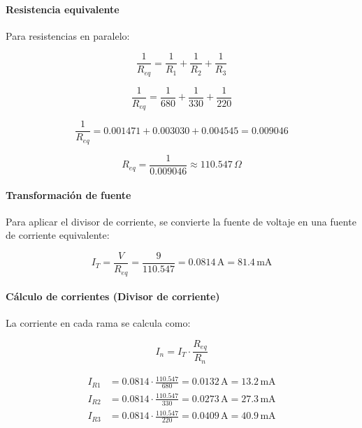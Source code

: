 \documentclass[conference]{IEEEtran}
\begin{document}
\paragraph{Resistencia equivalente}

Para resistencias en paralelo:

\begin{equation*}
  \frac{1}{R_{eq}} = \frac{1}{R_1} + \frac{1}{R_2} + \frac{1}{R_3}
\end{equation*}

\begin{equation*}
  \frac{1}{R_{eq}} = \frac{1}{680} + \frac{1}{330} + \frac{1}{220}
\end{equation*}

\begin{equation*}
  \frac{1}{R_{eq}} = 0.001471 + 0.003030 + 0.004545 = 0.009046
\end{equation*}

\begin{equation*}
  R_{eq} = \frac{1}{0.009046} \approx 110.547\,\Omega
\end{equation*}

\paragraph{Transformación de fuente}

Para aplicar el divisor de corriente, se convierte la fuente de voltaje en una fuente de corriente equivalente:

\begin{equation*}
  I_T = \frac{V}{R_{eq}} = \frac{9}{110.547} = 0.0814\,\text{A} = 81.4\,\text{mA}
\end{equation*}

\paragraph{Cálculo de corrientes (Divisor de corriente)}

La corriente en cada rama se calcula como:

\begin{equation}
  I_n = I_T \cdot \frac{R_{eq}}{R_n}
\end{equation}

\begin{align*}
  I_{R1} &= 0.0814 \cdot \frac{110.547}{680} 
         = 0.0132\,\text{A} = 13.2\,\text{mA} \\
  I_{R2} &= 0.0814 \cdot \frac{110.547}{330} 
         = 0.0273\,\text{A} = 27.3\,\text{mA} \\
  I_{R3} &= 0.0814 \cdot \frac{110.547}{220} 
       = 0.0409\,\text{A} = 40.9\,\text{mA}
\end{align*}
\end{document}
